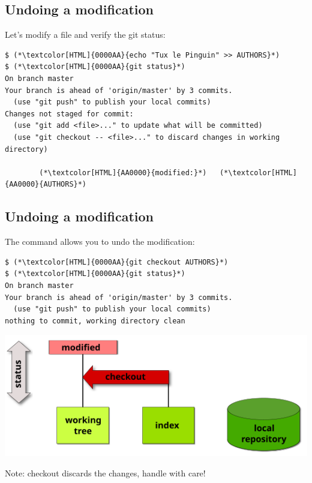 \subsection{Undoing a modification}
\begin{frame}[fragile]
\subslidetitle

  Let's modify a file and verify the git status:
  \begin{lstlisting}
$ (*\textcolor[HTML]{0000AA}{echo "Tux le Pinguin" >> AUTHORS}*)
$ (*\textcolor[HTML]{0000AA}{git status}*)
On branch master
Your branch is ahead of 'origin/master' by 3 commits.
  (use "git push" to publish your local commits)
Changes not staged for commit:
  (use "git add <file>..." to update what will be committed)
  (use "git checkout -- <file>..." to discard changes in working directory)

        (*\textcolor[HTML]{AA0000}{modified:}*)   (*\textcolor[HTML]{AA0000}{AUTHORS}*)

\end{lstlisting}

\end{frame}

\subsection{Undoing a modification}
\begin{frame}[fragile]
\subslidetitle
  The command  allows you to undo the modification:
  \begin{lstlisting}
$ (*\textcolor[HTML]{0000AA}{git checkout AUTHORS}*)
$ (*\textcolor[HTML]{0000AA}{git status}*)
On branch master
Your branch is ahead of 'origin/master' by 3 commits.
  (use "git push" to publish your local commits)
nothing to commit, working directory clean
\end{lstlisting}

  \vspace{1em}
  \centerline{\includegraphics{assets/diagrams/undo-modified}}

  \vspace{1em}
  Note: checkout discards the changes, handle with care!
\end{frame}

